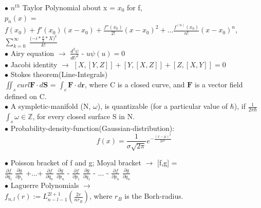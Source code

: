 \documentclass[a4paper, 10pt, onepage]{elegantbook}
\begin{document}
{$\bullet$  $n^{th}$ Taylor Polynomial about x = $x_0$ for f,  \\

$p_n(x)$ = $f(x_0) + f'(x_0)(x - x_0) + \frac{f''(x_0)}{2!}(x - x_0)^2 +...\frac{f^{(n)}{(x_0)}}{n!}(x - x_0)^n $,  \\    
$\sum_{k=0}^\infty$ $\frac{ ({-i} * {\frac{\theta}{2} * {X} )^k}} {k!}$  \\

$\bullet$ Airy equation $\longrightarrow$ $\frac{d^2 \psi} {dU^2}$ - $u \psi (u) = 0$  \\

$\bullet$ Jacobi identity $\longrightarrow$ $[X,[Y,Z]] + [Y,[X,Z]] + [Z, [X,Y]] = 0$  \\

$\bullet$ Stokes theorem(Line-Integrals)  \\

$\iint_s curl \mathbf F \cdot d \mathbf S$ = $\int_c \mathbf F \cdot d \mathbf r$, where C is a closed curve, and $\mathbf F$ is a vector field defined on C. \\

$\bullet$ A sympletic-manifold (N, $\omega$), is quantizable (for a particular value of $\hbar$), if
$\frac{1}{{2 \pi \hbar}}$ $\int_s \omega \in \mathbb Z$, for every closed surface S in N.  \\

$\bullet$ Probability-density-function(Gaussian-distribution):  \\
\begin{equation}
f(x) = \frac{1}{\sigma \sqrt{2 \pi}} e^{- \frac{(x - \mu)^2}{2 \sigma^2}}
\end{equation}

$\bullet$ Poisson bracket of f and g;  Moyal bracket $\longrightarrow$ [f,g] = \\

$\frac{\partial f}{\partial q_1}$ $\frac{\partial g}{\partial p_1}$ +...+ $\frac{\partial f}{\partial q_n}$ $\frac{\partial g}{\partial p_n}$ - $\frac{\partial f}{\partial p_1}$ $\frac{\partial g}{\partial q_1}$ - ... - $\frac{\partial f}{\partial p_n}$ $\frac{\partial g}{\partial q_n}$ \\

$\bullet$ Laguerre Polynomials $\longrightarrow$  \\

$f_{n,l}(r) := L_{n - l - 1}^{2l +  1}$$ \left( \frac{2r}{nr_B} \right)$, where $r_B$ is the Borh-radius.  \\

}
\end{document}
